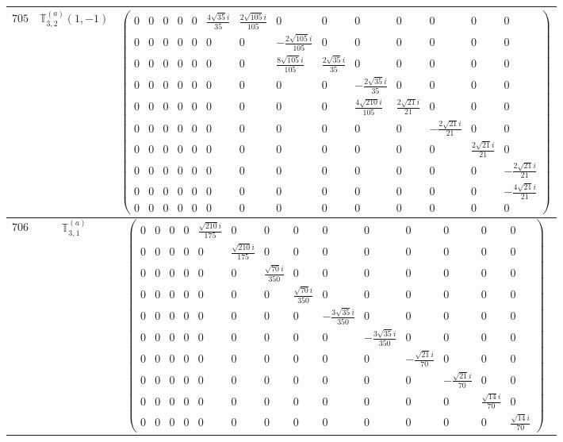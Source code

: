 \documentclass[fleqn,8pt,landscape]{jsarticle}
\begin{document}
\begin{center}
\begin{longtable}{ccc}
$ 705 $ & $ \mathbb{T}_{3,2}^{(a)}(1,-1) $ & $ \begin{pmatrix} 0 & 0 & 0 & 0 & 0 & \frac{4 \sqrt{35} i}{35} & \frac{2 \sqrt{105} i}{105} & 0 & 0 & 0 & 0 & 0 & 0 & 0 \\ 0 & 0 & 0 & 0 & 0 & 0 & 0 & - \frac{2 \sqrt{105} i}{105} & 0 & 0 & 0 & 0 & 0 & 0 \\ 0 & 0 & 0 & 0 & 0 & 0 & 0 & \frac{8 \sqrt{105} i}{105} & \frac{2 \sqrt{35} i}{35} & 0 & 0 & 0 & 0 & 0 \\ 0 & 0 & 0 & 0 & 0 & 0 & 0 & 0 & 0 & - \frac{2 \sqrt{35} i}{35} & 0 & 0 & 0 & 0 \\ 0 & 0 & 0 & 0 & 0 & 0 & 0 & 0 & 0 & \frac{4 \sqrt{210} i}{105} & \frac{2 \sqrt{21} i}{21} & 0 & 0 & 0 \\ 0 & 0 & 0 & 0 & 0 & 0 & 0 & 0 & 0 & 0 & 0 & - \frac{2 \sqrt{21} i}{21} & 0 & 0 \\ 0 & 0 & 0 & 0 & 0 & 0 & 0 & 0 & 0 & 0 & 0 & 0 & \frac{2 \sqrt{21} i}{21} & 0 \\ 0 & 0 & 0 & 0 & 0 & 0 & 0 & 0 & 0 & 0 & 0 & 0 & 0 & - \frac{2 \sqrt{21} i}{21} \\ 0 & 0 & 0 & 0 & 0 & 0 & 0 & 0 & 0 & 0 & 0 & 0 & 0 & - \frac{4 \sqrt{21} i}{21} \\ 0 & 0 & 0 & 0 & 0 & 0 & 0 & 0 & 0 & 0 & 0 & 0 & 0 & 0 \end{pmatrix} $ \\ \hline
$ 706 $ & $ \mathbb{T}_{3,1}^{(a)} $ & $ \begin{pmatrix} 0 & 0 & 0 & 0 & \frac{\sqrt{210} i}{175} & 0 & 0 & 0 & 0 & 0 & 0 & 0 & 0 & 0 \\ 0 & 0 & 0 & 0 & 0 & \frac{\sqrt{210} i}{175} & 0 & 0 & 0 & 0 & 0 & 0 & 0 & 0 \\ 0 & 0 & 0 & 0 & 0 & 0 & \frac{\sqrt{70} i}{350} & 0 & 0 & 0 & 0 & 0 & 0 & 0 \\ 0 & 0 & 0 & 0 & 0 & 0 & 0 & \frac{\sqrt{70} i}{350} & 0 & 0 & 0 & 0 & 0 & 0 \\ 0 & 0 & 0 & 0 & 0 & 0 & 0 & 0 & - \frac{3 \sqrt{35} i}{350} & 0 & 0 & 0 & 0 & 0 \\ 0 & 0 & 0 & 0 & 0 & 0 & 0 & 0 & 0 & - \frac{3 \sqrt{35} i}{350} & 0 & 0 & 0 & 0 \\ 0 & 0 & 0 & 0 & 0 & 0 & 0 & 0 & 0 & 0 & - \frac{\sqrt{21} i}{70} & 0 & 0 & 0 \\ 0 & 0 & 0 & 0 & 0 & 0 & 0 & 0 & 0 & 0 & 0 & - \frac{\sqrt{21} i}{70} & 0 & 0 \\ 0 & 0 & 0 & 0 & 0 & 0 & 0 & 0 & 0 & 0 & 0 & 0 & \frac{\sqrt{14} i}{70} & 0 \\ 0 & 0 & 0 & 0 & 0 & 0 & 0 & 0 & 0 & 0 & 0 & 0 & 0 & \frac{\sqrt{14} i}{70} \end{pmatrix} $ \\ \hline

\end{longtable}
\end{center}
\end{document}
